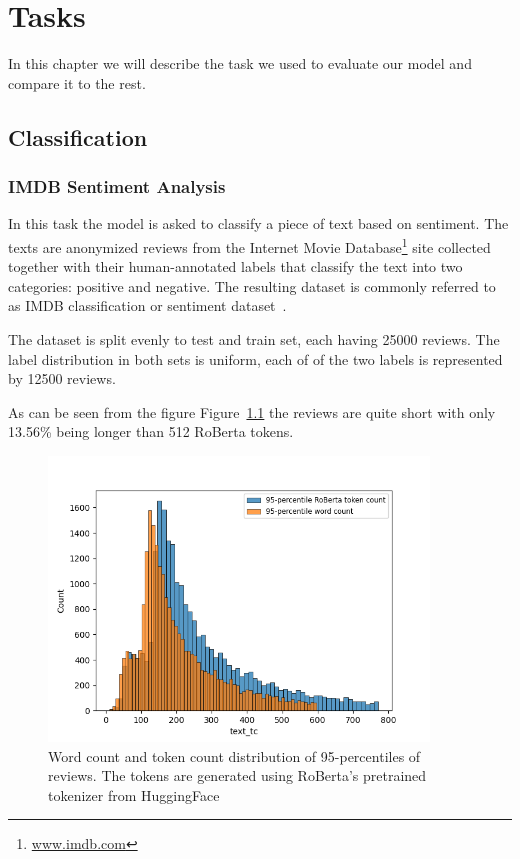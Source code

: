 \chapter{Tasks}

In this chapter we will describe the task we used to evaluate our model and
compare it to the rest.

\section{Classification}

\subsection{IMDB Sentiment Analysis}

In this task the model is asked to classify a piece of text based on sentiment.
The texts are anonymized reviews from the Internet Movie
Database\footnote{\url{www.imdb.com}} site collected together with their
human-annotated labels that classify the text into two categories: positive and
negative. The resulting dataset is commonly referred to as IMDB classification
or sentiment dataset~\cite{maas11}.

The dataset is split evenly to test and train set, each having 25000 reviews.
The label distribution in both sets is uniform, each of of the two labels is
represented by 12500 reviews.

As can be seen from the figure Figure~\ref{fig:imdb_word_token_dist} the reviews
are quite short with only 13.56\% being longer than 512 RoBerta tokens.

\begin{figure}[h]
  \centering
  \includegraphics[width=0.9\textwidth]{img/imdb_word_token_distributions.png}
  \caption{Word count and token count distribution of 95-percentiles of
  reviews. The tokens are generated using RoBerta's pretrained tokenizer from
  HuggingFace}\label{fig:imdb_word_token_dist}
\end{figure}
